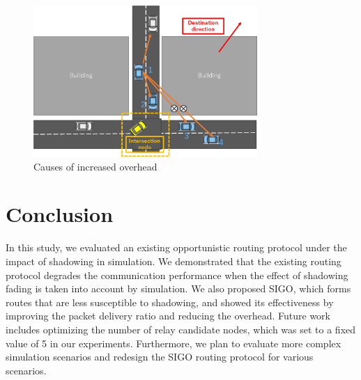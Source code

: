 \documentclass[conference]{IEEEtran}
\begin{document}
\begin{figure}[!ht]
\centering
\includegraphics[width=85mm]{figures/overhead_reason.eps}
\caption{Causes of increased overhead}
\label{fig:overhead_reason}
\end{figure}



\section{Conclusion}
\label{conclusion}
In this study, we evaluated an existing opportunistic routing protocol under the impact of shadowing in simulation. We demonstrated that the existing routing protocol degrades the communication performance when the effect of shadowing fading is taken into account by simulation. We also proposed SIGO, which forms routes that are less susceptible to shadowing, and showed its effectiveness by improving the packet delivery ratio and reducing the overhead. Future work includes optimizing the number of relay candidate nodes, which was set to a fixed value of 5 in our experiments. Furthermore, we plan to evaluate more complex simulation scenarios and redesign the SIGO routing protocol for various scenarios.



\end{document}
